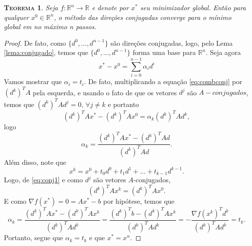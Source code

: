\documentclass[
	12pt,				%
    oneside,			%
	a4paper,			%
	english,			%
	french,				%
	spanish,			%
	brazil,				%
	]{abntex2}
\newtheorem{theorem}{\scshape Teorema}[section]
\begin{document}
        \begin{theorem}
            Seja $f: \mathbb{R}^n \to \mathbb{R}$ e denote por $x^{*}$ seu minimizador global. Então para qualquer $x^0 \in \mathbb{R}^n$, o método das direções conjugadas converge para o mínimo global em no máximo n passos.
        \end{theorem}
        \begin{proof}
            De fato, como $\{d^0,...,d^{n-1}\}$ são direções conjugadas, logo, pelo Lema \ref{lema:conjugado}, temos que $\{d^0,...,d^{n-1}\}$ forma uma base para $\mathbb{R}^n$. Seja agora
            \begin{equation}\label{eq:combconj}
                x^{*} - x^0 = \sum_{i=0}^{n-1} \alpha_i d^i
            \end{equation}
            Vamos mostrar que $\alpha_i = t_i$. De fato, multiplicando a equação \eqref{eq:combconj} por $(d^k)^T A$ pela esquerda, e usando o fato de que os vetores $d^j$ são $A-conjugados$, temos que $(d^k)^T Ad^j = 0\mbox{, } \forall j \neq k$ e portanto
            \begin{equation*}
                (d^k)^T A x^{*} - (d^k)^T Ax^0 = \alpha_k (d^k)^T A d^k,
            \end{equation*}
            logo
            \begin{equation}\label{eq:alphaconj}
                \alpha_k = \frac{(d^k)^T A x^{*} - (d^k)^T Ad}{(d^k)^T A d}.
            \end{equation}
            Além disso, note que
            \begin{equation}\label{eq:conj1}
                x^k = x^0 + t_0 d^0 + t_1d^1 + ... + t_{k-1}d^{k-1}.
            \end{equation}
            Logo, de \eqref{eq:conj1} e como $d^j$ são vetores $A$-conjugados,
            \begin{equation*}
                (d^k)^T A x^k = (d^k)^T A x^0.
            \end{equation*}
            E como $\nabla f(x^{*}) = 0 = Ax^{*} - b$ por hipótese, temos que
            \begin{equation*}
                \alpha_k = \frac{(d^k)^TAx^{*} - (d^k)^TAx^k}{(d^k)^T A d^k} = \frac{(d^k)^Tb - (d^k)^TAx^k}{(d^k)^T A d^k} = -\frac{\nabla f(x^k)^Td^k}{(d^k)^T A d^k} = t_k.
            \end{equation*}
            Portanto, segue que $\alpha_k = t_k$ e que $x^{*} = x^n$.
        \end{proof}
\end{document}
